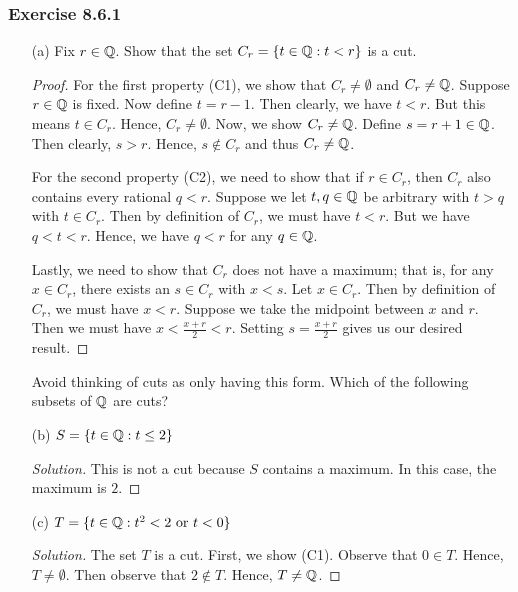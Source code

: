 \subsubsection{Exercise 8.6.1} 
\begin{enumerate}
    \item[(a)] Fix \( r \in \mathbb{Q}  \). Show that the set \( C_{r} = \{ t \in \mathbb{Q} : t < r  \}  \) is a cut.
        \begin{proof}
        For the first property (C1), we show that \( C_{r} \neq \emptyset  \) and \( C_{r} \neq \mathbb{Q}  \). Suppose \( r \in \mathbb{Q}  \) is fixed. Now define \( t = r - 1  \). Then clearly, we have \( t  <r  \). But this means \( t \in C_{r } \). Hence, \(  C_{r} \neq \emptyset \). Now, we show \( C_{r} \neq \mathbb{Q}  \). Define \( s = r + 1 \in \mathbb{Q}   \). Then clearly, \( s > r  \). Hence, \( s \notin C_{r} \) and thus \( C_{r} \neq \mathbb{Q}  \).

        For the second property (C2), we need to show that if \( r \in C_{r} \), then \( C_{r}  \) also contains every rational \( q < r  \). Suppose we let \( t,q  \in \mathbb{Q}  \) be arbitrary with \( t > q  \) with \( t \in C_{r} \). Then by definition of \( C_{r} \), we must have \( t < r  \). But we have \( q < t < r  \). Hence, we have \( q < r  \) for any \( q \in \mathbb{Q}  \). 

        Lastly, we need to show that \( C_{r}  \) does not have a maximum; that is, for any \( x \in C_{r}  \), there exists an \( s \in C_{r}  \) with \( x < s  \). Let \( x \in C_{r}  \). Then by definition of \( C_{r}  \), we must have \( x < r  \). Suppose we take the midpoint between \( x \) and \( r  \). Then we must have \( x < \frac{ x  +r  }{ 2  } < r  \). Setting \( s = \frac{ x +r  }{ 2  }  \) gives us our desired result.
        \end{proof}
        Avoid thinking of cuts as only having this form. Which of the following subsets of \( \mathbb{Q}  \) are cuts?
    \item[(b)] \( S = \{ t \in \mathbb{Q} : t \leq 2  \}  \)
        \begin{proof}[Solution]
        This is not a cut because \( S  \) contains a maximum. In this case, the maximum is \( 2  \).
        \end{proof}
    \item[(c)] \( T = \{ t \in \mathbb{Q} : t^{2} < 2 \ \text{or} \ t < 0  \}  \)
        \begin{proof}[Solution]
        The set \( T  \) is a cut. First, we show (C1). Observe that \(  0 \in T  \). Hence, \( T \neq \emptyset \). Then observe that \(  2 \notin T  \). Hence, \(  T \neq \mathbb{Q}  \). 


\end{proof}
\end{enumerate}
